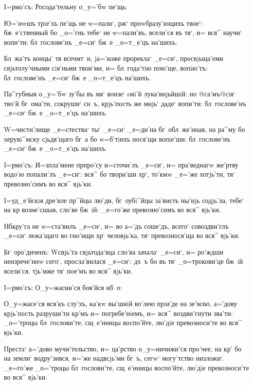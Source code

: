  I=рмо'съ: Росода'тельну о_у='бw пе'щь:

Ю='нwшъ трiе'хъ пе'щь не w=пали`, рж` 
проwбразу'ющихъ твое`: бж~е'ственный бо _о='гнь тебе` не 
w=пали'въ, всели'ся въ тя`, и= вся^ научи` вопи'ти: 
бл~гослове'нъ _е=си` бж~е _о=т_е'цъ на'шихъ.

Бл~жа'тъ концы' тя всеч мт~и, jа='коже прорекла` 
_е=си`, просвjьща'еми свjьтолу'чными сiя'ньми твои'ми, и= 
бл~года'тiю пою'ще, вопiю'тъ: бл~гослове'нъ _е=си` бж~е 
_о=т_е'цъ на'шихъ.

Па^губныя о_у='бw зу'бы въ мя` вонзе` sмi'й 
лука'внjьйшiй: но @са'мъ@{сiя`} тво'й бг~ома'ти, 
сокруши` сн~ъ, крjь'пость же мнjь` даде` вопи'ти: 
бл~гослове'нъ _е=си` бж~е _о=т_е'цъ на'шихъ.

W=чисти'лище _е=стества` ты` _е=си` _е=ди'на 
бг~обл~же'нная, на ра^му бо херувi^мску сjьдя'щаго бг~а 
бо w=б'тiихъ нося'щи вопiе'ши: бл~гослове'нъ _е=си` 
бж~е _о=т_е'цъ на'шихъ.


I=рмо'съ: И=з\ъ пла'мене прп ро'су и=сточи'лъ 
_е=си`, и= пра'веднагw же'ртву водо'ю попали'лъ _е=си`: 
вся^ бо твори'ши хр`, то'кмw _е='же хотjь'ти, тя` 
превозно'симъ во вся^ вjь'ки.

I=уд_е'йскiя дре'вле пр^йцы лю'ди, 
бг~оубi^йцы за'висть ны'нjь содjь'ла, тебе` на кр 
возне'сшыя, сло'ве бж~iй: _е=го'же превозно'симъ во вся^ 
вjь'ки.

Нб кру'га не w=ста'вилъ _е=си`, и= во а='дъ 
соше'дъ, всего` совоздви'глъ _е=си` лежа'щаго во гно'ищи 
хр` человjь'ка, тя` превознося'ща во вся^ вjь'ки.

Бг~оро'диченъ: W\т свjь'та свjьтода'вца сло'ва зачала` 
_е=си`, и= ро'ждши неизрече'ннw сего`, просла'вилася 
_е=си`: дх~ъ бо въ тя` _о=трокови'це бж~iй всели'ся. 
тjь'мже тя` пое'мъ во вся^ вjь'ки. 

 I=рмо'съ: О_у=жасни'ся боя'йся нб~о:

О_у=жасе'ся вся'къ слу'хъ, ка'кw вы'шнiй во'лею 
прiи'де на зе'млю, а='дову крjь'пость разруши'ти 
кр'мъ и= погребе'нiемъ, и= вся^ воздви'гнути зва'ти: 
_о='троцы бл~гослови'те, сщ~е'нницы воспо'йте, лю'дiе 
превозноси'те во вся^ вjь'ки.

Преста` а='дово мучи'тельство, и= ца'рство 
о_у=ничижи'ся про'чее, на кр' бо на земли` 
водру'зився, и='же над\ъ всjь'ми бг~ъ, сегw` могу'тство 
низложи`. _е=го'же _о='троцы бл~гослови'те, сщ~е'нницы 
воспо'йте, лю'дiе превозноси'те во вся^ вjь'ки.

